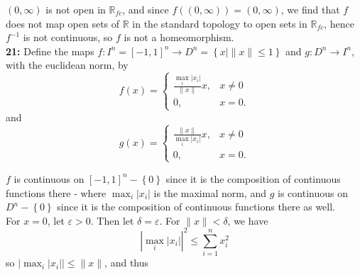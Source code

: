 \documentclass[a4paper]{article}
\begin{document}
    $(0, \infty)$ is not open in $\mathbb{R}_{fc}$, and since
    $f\left( (0, \infty) \right) = \left( 0, \infty \right) $, we find that
    $f$ does not map open sets of $\mathbb{R}$ in the standard topology to open
    sets in $\mathbb{R}_{fc}$, hence $f^{-1}$  is not continuous, so $f$ is not
    a homeomorphism.\\
    \linebreak
    \textbf{21:} 
    Define the maps
    $f  \colon I^{n} = \left[ -1,1 \right]^{n} \to D^{n} = \left\{ 
    x  \mid \|x\|\le 1 \right\} $ and
    $g  \colon D^{n} \to I^{n}$, with the euclidean norm, by
    \[
    f\left( x \right) 
    = \begin{cases}
        \frac{\max_{i}|x_i|}{\|x\|} x,& x \neq 0\\
        0,& x=0.
    \end{cases}
\]
and
\[
g(x) = 
\begin{cases}
    \frac{\|x\|}{\max_i |x_i|} x,& x\neq 0\\
    0, & x=0.
\end{cases}
\] 

    $f$ is continuous on $\left[ -1,1 \right]^{n} - \left\{ 0 \right\}
    $ since
    it is the composition of continuous functions there - where
    $\max_i |x_i| $ is the maximal norm, and
    $g$ is continuous on $D^{n} - \left\{ 0 \right\} $ since it is the
    composition
    of continuous functions there as well.\\
    \linebreak
    For $x=0$, let $\varepsilon > 0$. Then let
    $\delta = \varepsilon$. For $\|x\| < \delta$, we have
    \[
    \left| \max_i |x_i|  \right|^2
    \le \sum_{i=1}^{n} x_i^2
    \] 
    so $\left| \max_i |x_i| \right| \le 
    \|x\|$, and thus
    
\end{document}
